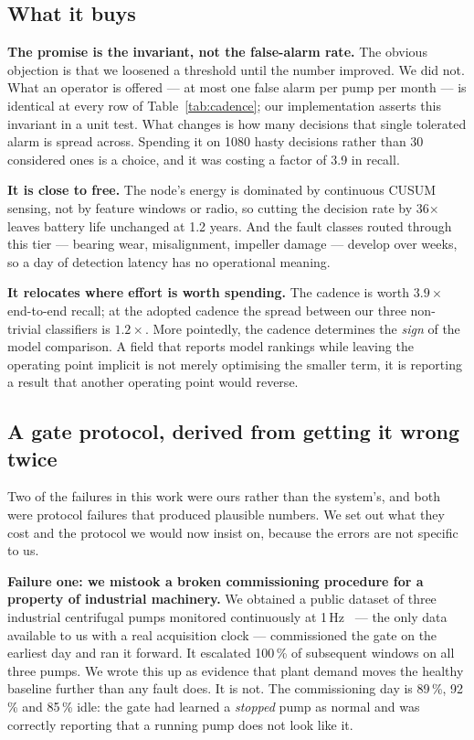 \documentclass[conference,a4paper,10pt]{IEEEtran}
\begin{document}
\subsection{What it buys}
\textbf{The promise is the invariant, not the false-alarm rate.} The obvious
objection is that we loosened a threshold until the number improved. We did not.
What an operator is offered --- at most one false alarm per pump per month --- is
identical at every row of Table~\ref{tab:cadence}; our implementation asserts this
invariant in a unit test. What changes is how many decisions that single tolerated
alarm is spread across. Spending it on 1080 hasty decisions rather than 30
considered ones is a choice, and it was costing a factor of 3.9 in recall.

\textbf{It is close to free.} The node's energy is dominated by continuous CUSUM
sensing, not by feature windows or radio, so cutting the decision rate by 36$\times$
leaves battery life unchanged at 1.2 years. And the fault classes routed through
this tier --- bearing wear, misalignment, impeller damage --- develop over weeks,
so a day of detection latency has no operational meaning.

\textbf{It relocates where effort is worth spending.} The cadence is worth
$3.9\times$ end-to-end recall; at the adopted cadence the spread between our three
non-trivial classifiers is $1.2\times$. More pointedly, the cadence determines the
\emph{sign} of the model comparison. A field that reports model rankings while
leaving the operating point implicit is not merely optimising the smaller term, it
is reporting a result that another operating point would reverse.

\subsection{A gate protocol, derived from getting it wrong twice}
\label{sec:protocol}
Two of the failures in this work were ours rather than the system's, and both were
protocol failures that produced plausible numbers. We set out what they cost and the
protocol we would now insist on, because the errors are not specific to us.

\textbf{Failure one: we mistook a broken commissioning procedure for a property of
industrial machinery.} We obtained a public dataset of three industrial centrifugal
pumps monitored continuously at 1\,Hz~\cite{cira2025} --- the only data available to
us with a real acquisition clock --- commissioned the gate on the earliest day and
ran it forward. It escalated 100\,\% of subsequent windows on all three pumps. We
wrote this up as evidence that plant demand moves the healthy baseline further than
any fault does. It is not. The commissioning day is 89\,\%, 92\,\% and 85\,\% idle:
the gate had learned a \emph{stopped} pump as normal and was correctly reporting that
a running pump does not look like it.
\end{document}
